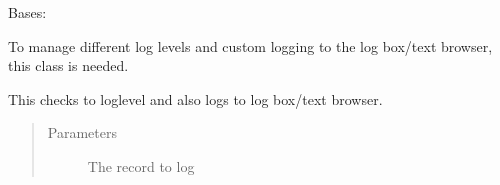 \documentclass[letterpaper,10pt,english]{sphinxmanual}
\begin{document}
\begin{fulllineitems}
\label{\detokenize{src:src.Logger.LogHandler}}
Bases: 

To manage different log levels and custom logging to the log box/text browser, this class is needed.

\begin{fulllineitems}
\label{\detokenize{src:src.Logger.LogHandler.__init__}}
\end{fulllineitems}


\begin{fulllineitems}
\label{\detokenize{src:src.Logger.LogHandler.emit}}
This checks to loglevel and also logs to log box/text browser.
\begin{quote}\begin{description}
\item[{Parameters}] \leavevmode
{} \textendash{} The record to log

\end{description}\end{quote}

\end{fulllineitems}


\end{fulllineitems}

\end{document}
